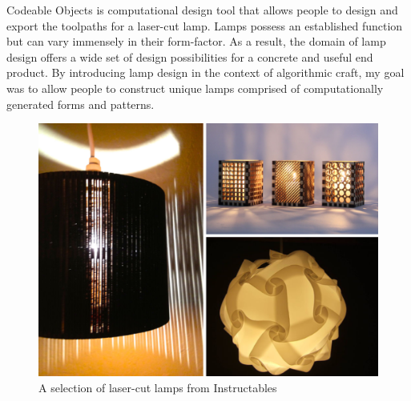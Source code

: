 Codeable Objects is computational design tool that allows people to design and export the toolpaths for a laser-cut lamp. Lamps possess an established function but can vary immensely in their form-factor. As a result, the domain of lamp design offers a wide set of design possibilities for a concrete and useful end product. By introducing lamp design in the context of algorithmic craft, my goal was to allow people to construct unique lamps comprised of computationally generated forms and patterns. 
\begin{center}
\begin{figure}[h!]
\includegraphics[width=\columnwidth]{images/instructables_lamps.png}
\caption{A selection of laser-cut lamps from Instructables}
\end{figure}
\end{center}

